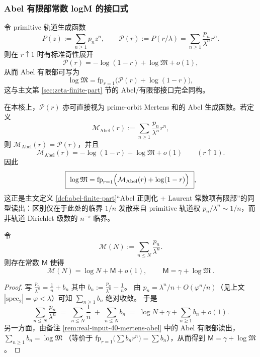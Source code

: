 \subsubsection{Abel 有限部常数 logM 的接口式}\label{app:real-input-40-finite-part}
令 primitive 轨道生成函数
\[
P(z):=\sum_{n\ge 1}p_n z^n,
\qquad
\mathcal{P}(r):=P(r/\lambda)=\sum_{n\ge 1}\frac{p_n}{\lambda^n}r^n.
\]
则在 $r\uparrow 1$ 时有标准奇性展开
\[
\mathcal{P}(r)=-\log(1-r)+\log\mathfrak{M}+o(1),
\]
从而 Abel 有限部可写为
\[
\log\mathfrak{M}=\mathrm{fp}_{r=1}\bigl(\mathcal{P}(r)+\log(1-r)\bigr),
\]
这与主文第 \ref{sec:zeta-finite-part} 节的 Abel/有限部接口完全同构。

\begin{remark}\label{rem:real-input-40-mertens-abel}
在本核上，$\mathcal{P}(r)$ 亦可直接视为 prime-orbit Mertens 和的 Abel 生成函数。若定义
\[
\mathcal{M}_{\mathrm{Abel}}(r):=\sum_{n\ge 1}\frac{p_n}{\lambda^n}r^n,
\]
则 $\mathcal{M}_{\mathrm{Abel}}(r)=\mathcal{P}(r)$，并且
\[
\mathcal{M}_{\mathrm{Abel}}(r)=-\log(1-r)+\log\mathfrak{M}+o(1)\qquad(r\uparrow 1).
\]
因此
\[
\boxed{\ \log\mathfrak{M}=\mathrm{fp}_{r=1}\Bigl(\mathcal{M}_{\mathrm{Abel}}(r)+\log(1-r)\Bigr)\ },
\]
这正是主文定义 \ref{def:abel-finite-part}“Abel 正则化 + Laurent 常数项有限部”的同型读出：区别仅在于此处的临界 $1/n$ 发散来自 primitive 轨道权 $p_n/\lambda^n\sim 1/n$，而非轨道 Dirichlet 级数的 $n^{-s}$ 临界。
\end{remark}

\begin{corollary}\label{cor:real-input-40-Mertens-constant}
令
\[
\mathcal{M}(N):=\sum_{n\le N}\frac{p_n}{\lambda^n}.
\]
则存在常数 $\mathsf{M}$ 使得
\[
\mathcal{M}(N)=\log N+\mathsf{M}+o(1),
\qquad
\boxed{\ \mathsf{M}=\gamma+\log\mathfrak{M}\ }.
\]
\end{corollary}

\begin{proof}
写
\(
\frac{p_n}{\lambda^n}=\frac{1}{n}+b_n
\)
其中 $b_n:=\frac{p_n}{\lambda^n}-\frac{1}{n}$。
由 $p_n=\lambda^n/n+O(\varphi^n/n)$（见上文 $|\mathrm{spec}_2|=\varphi<\lambda$）可知 $\sum_{n\ge 1}b_n$ 绝对收敛。
于是
\[
\sum_{n\le N}\frac{p_n}{\lambda^n}
\;=\;
\sum_{n\le N}\frac{1}{n}
\;+\;
\sum_{n\le N}b_n
\;=\;
\log N+\gamma+\sum_{n\ge 1}b_n+o(1).
\]
另一方面，由备注 \ref{rem:real-input-40-mertens-abel} 中的 Abel 有限部读出，
\(
\sum_{n\ge 1}b_n=\log\mathfrak{M}
\)
（等价于 $\mathrm{fp}_{r=1}\bigl(\sum b_n r^n\bigr)=\sum b_n$），从而得到 $\mathsf{M}=\gamma+\log\mathfrak{M}$。
\end{proof}

